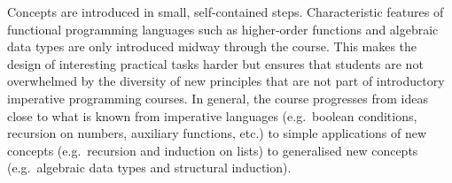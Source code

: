 Concepts are introduced in small, self-contained steps.
Characteristic features of functional programming languages such as
higher-order functions and algebraic data types are
only introduced midway through the course.
This makes the design of interesting practical tasks harder
but ensures that students are not overwhelmed by the diversity
of new principles that are not part of introductory imperative programming courses.
In general, the course progresses from ideas close to what is known from imperative languages (e.g.\ boolean conditions, recursion on numbers, auxiliary functions, etc.)
to simple applications of new concepts (e.g.\ recursion and induction on lists)
to generalised new concepts (e.g.\ algebraic data types and structural induction).


